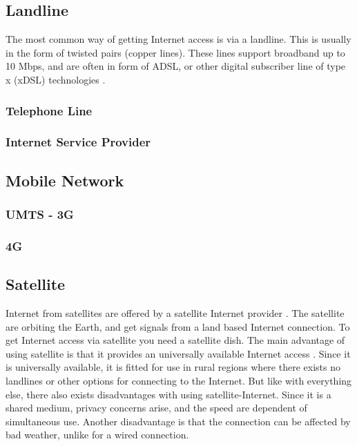 
\subsection{Landline}
The most common way of getting Internet access is via a landline. This is usually in the form of twisted pairs (copper lines). These lines support broadband up to 10 Mbps, and are often in form of ADSL, or other digital subscriber line of type x (xDSL) technologies \citep{audestad}. 

\subsubsection{Telephone Line}
\subsubsection{Internet Service Provider}

\subsection{Mobile Network}
\subsubsection{UMTS - 3G}
\subsubsection{4G}

\subsection{Satellite}

Internet from satellites are offered by a satellite Internet provider \cite{cablevssatellite}. The satellite are orbiting the Earth, and get signals from a land based Internet connection. To get Internet access via satellite you need a satellite dish. The main advantage of using satellite is that it provides an universally available Internet access \cite{broadband}. Since it is universally available, it is fitted for use in rural regions where there exists no landlines or other options for connecting to the Internet. But like with everything else, there also exists disadvantages with using satellite-Internet. Since it is a shared medium, privacy concerns arise, and the speed are dependent of simultaneous use. Another disadvantage is that the connection can be affected by bad weather, unlike for a wired connection.

